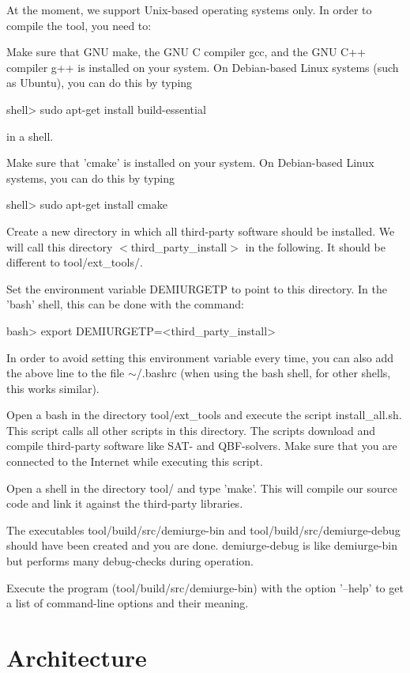 At the moment, we support Unix-\/based operating systems only. In order to compile the tool, you need to\-: 
\begin{DoxyEnumerate}
\item Make sure that G\-N\-U make, the G\-N\-U C compiler gcc, and the G\-N\-U C++ compiler g++ is installed on your system. On Debian-\/based Linux systems (such as Ubuntu), you can do this by typing \begin{DoxyVerb}shell> sudo apt-get install build-essential \end{DoxyVerb}
 in a shell. 
\item Make sure that 'cmake' is installed on your system. On Debian-\/based Linux systems, you can do this by typing \begin{DoxyVerb}shell> sudo apt-get install cmake \end{DoxyVerb}
 
\item Create a new directory in which all third-\/party software should be installed. We will call this directory {\ttfamily $<$third\-\_\-party\-\_\-install$>$} in the following. It should be different to tool/ext\-\_\-tools/. 
\item Set the environment variable D\-E\-M\-I\-U\-R\-G\-E\-T\-P to point to this directory. In the 'bash' shell, this can be done with the command\-: \begin{DoxyVerb}bash> export DEMIURGETP=<third_party_install>  \end{DoxyVerb}
 In order to avoid setting this environment variable every time, you can also add the above line to the file {\ttfamily $\sim$/}.bashrc (when using the bash shell, for other shells, this works similar). 
\item Open a bash in the directory {\ttfamily tool/ext\-\_\-tools} and execute the script {\ttfamily install\-\_\-all.\-sh}. This script calls all other scripts in this directory. The scripts download and compile third-\/party software like S\-A\-T-\/ and Q\-B\-F-\/solvers. Make sure that you are connected to the Internet while executing this script. 
\item Open a shell in the directory {\ttfamily tool/} and type 'make'. This will compile our source code and link it against the third-\/party libraries. 
\item The executables {\ttfamily tool/build/src/demiurge-\/bin} and {\ttfamily tool/build/src/demiurge-\/debug} should have been created and you are done. {\ttfamily demiurge-\/debug} is like {\ttfamily demiurge-\/bin} but performs many debug-\/checks during operation. 
\item Execute the program ({\ttfamily tool/build/src/demiurge-\/bin}) with the option '--help' to get a list of command-\/line options and their meaning. 
\end{DoxyEnumerate}\hypertarget{index_archit_sec}{}\section{Architecture}\label{index_archit_sec}
